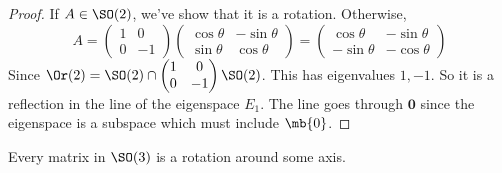 \documentclass[a4paper]{article}
\begin{document}
  \begin{proof}
    If $A\in \SO(2)$, we've show that it is a rotation. Otherwise,
    \[
      A = 
      \begin{pmatrix}
        1 & 0\\
        0 & -1
      \end{pmatrix}
      \begin{pmatrix}
        \cos\theta & -\sin\theta\\
        \sin\theta & \cos\theta
      \end{pmatrix} = 
      \begin{pmatrix}
        \cos\theta & -\sin\theta \\
        -\sin\theta & -\cos\theta
      \end{pmatrix}
    \]
    Since $\Or(2) = \SO(2)\cap 
    \begin{pmatrix}
      1&0\\0&-1
    \end{pmatrix}\SO(2)$. This has eigenvalues $1, -1$. So it is a reflection in the line of the eigenspace $E_1$. The line goes through $\mathbf{0}$ since the eigenspace is a subspace which must include $\mb{0}$.
  \end{proof}

  \begin{lemma}
    Every matrix in $\SO(3)$ is a rotation around some axis. 
  \end{lemma}
\end{document}
